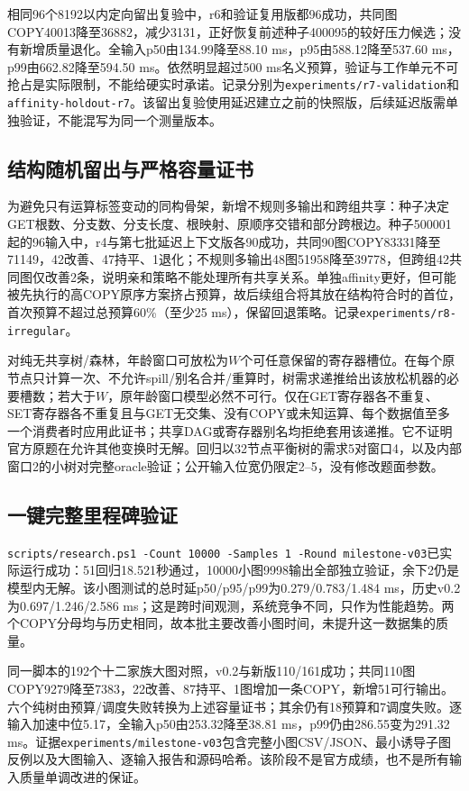 \documentclass[UTF8,11pt,fontset=fandol]{ctexart}
\begin{document}
相同96个8192以内定向留出复验中，r6和验证复用版都96成功，共同图COPY40013降至36882，减少3131，正好恢复前述种子400095的较好压力候选；没有新增质量退化。全输入p50由134.99降至88.10 ms，p95由588.12降至537.60 ms，p99由662.82降至594.50 ms。依然明显超过500 ms名义预算，验证与工作单元不可抢占是实际限制，不能给硬实时承诺。记录分别为\texttt{experiments/r7-validation}和\texttt{affinity-holdout-r7}。该留出复验使用延迟建立之前的快照版，后续延迟版需单独验证，不能混写为同一个测量版本。

\subsection{结构随机留出与严格容量证书}
为避免只有运算标签变动的同构骨架，新增不规则多输出和跨组共享：种子决定GET根数、分支数、分支长度、根映射、原顺序交错和部分跨根边。种子500001起的96输入中，r4与第七批延迟上下文版各90成功，共同90图COPY83331降至71149，42改善、47持平、1退化；不规则多输出48图51958降至39778，但跨组42共同图仅改善2条，说明亲和策略不能处理所有共享关系。单独affinity更好，但可能被先执行的高COPY原序方案挤占预算，故后续组合将其放在结构符合时的首位，首次预算不超过总预算60\%（至少25 ms），保留回退策略。记录\texttt{experiments/r8-irregular}。

对纯无共享树/森林，年龄窗口可放松为$W$个可任意保留的寄存器槽位。在每个原节点只计算一次、不允许spill/别名合并/重算时，树需求递推给出该放松机器的必要槽数；若大于$W$，原年龄窗口模型必然不可行。仅在GET寄存器各不重复、SET寄存器各不重复且与GET无交集、没有COPY或未知运算、每个数据值至多一个消费者时应用此证书；共享DAG或寄存器别名均拒绝套用该递推。它不证明官方原题在允许其他变换时无解。回归以32节点平衡树的需求5对窗口4，以及内部窗口2的小树对完整oracle验证；公开输入位宽仍限定2--5，没有修改题面参数。

\subsection{一键完整里程碑验证}
\texttt{scripts/research.ps1 -Count 10000 -Samples 1 -Round milestone-v03}已实际运行成功：51回归18.521秒通过，10000小图9998输出全部独立验证，余下2仍是模型内无解。该小图测试的总时延p50/p95/p99为0.279/0.783/1.484 ms，历史v0.2为0.697/1.246/2.586 ms；这是跨时间观测，系统竞争不同，只作为性能趋势。两个COPY分母均与历史相同，故本批主要改善小图时间，未提升这一数据集的质量。

同一脚本的192个十二家族大图对照，v0.2与新版110/161成功；共同110图COPY9279降至7383，22改善、87持平、1图增加一条COPY，新增51可行输出。六个纯树由预算/调度失败转换为上述容量证书；其余仍有18预算和7调度失败。逐输入加速中位5.17，全输入p50由253.32降至38.81 ms，p99仍由286.55变为291.32 ms。证据\texttt{experiments/milestone-v03}包含完整小图CSV/JSON、最小诱导子图反例以及大图输入、逐输入报告和源码哈希。该阶段不是官方成绩，也不是所有输入质量单调改进的保证。
\end{document}
